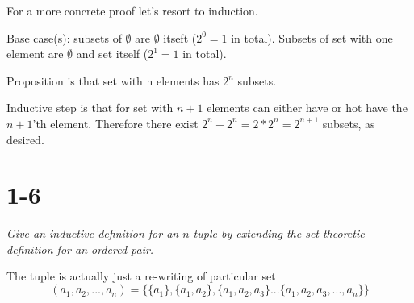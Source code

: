 \documentclass[11pt,oneside,titlepage]{book}
\begin{document}
For a more concrete proof let's resort to induction.

Base case(s): subsets of $\emptyset$ are $\emptyset$ itseft
($2^0 = 1$ in total). Subsets of
set with one element are $\emptyset$ and set itself ($2^1 = 1$ in total).

Proposition is that set with n elements has $2^n$ subsets.

Inductive step is that for set with $n + 1$ elements can either have or hot
have the $n + 1$'th element. Therefore there exist $2^n + 2^n = 2 * 2^n =
2^{n + 1}$ subsets, as desired.

\section*{1-6}
\textit{Give an inductive definition for an $n$-tuple by extending the
  set-theoretic definition for an ordered pair.}

The tuple is actually just a re-writing of particular set
$$(a_1, a_2, ..., a_n) = \{\{a_1\}, \{a_1, a_2\}, \{a_1, a_2, a_3\} ...
\{a_1, a_2, a_3, ..., a_n\}\}$$
\end{document}
